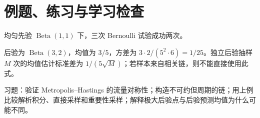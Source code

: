 \section{例题、练习与学习检查}

\begin{example}[先用解析解检验近似]
均匀先验 $\operatorname{Beta}(1,1)$ 下，三次 Bernoulli 试验成功两次。
\end{example}
\begin{solve}
后验为 $\operatorname{Beta}(3,2)$，均值为 $3/5$，方差为 $3\cdot2/(5^2\cdot6)=1/25$。独立后验抽样 $M$ 次的均值估计标准差为 $1/(5\sqrt M)$；若样本来自相关链，则不能直接使用此式。
\end{solve}

习题：验证 Metropolis--Hastings 的流量对称性；构造不可约但周期的链；用上例比较解析积分、直接采样和重要性采样；解释极大后验点与后验预测均值为什么可能不同。






